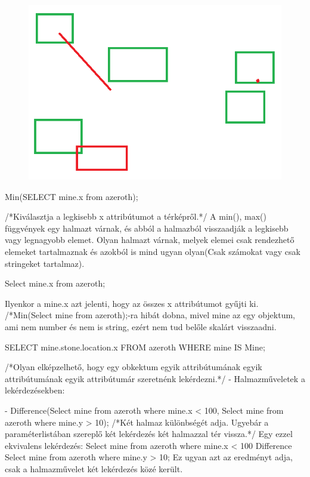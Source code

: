 \begin{sql}
\begin{figure}[htb]
\begin{center}
    \includegraphics[scale=0.5]{images/selection}
    \caption{}
    \label{fig:selection}
\end{center}
\end{figure}

\begin{sql}
Min(SELECT mine.x from azeroth);
\end{sql}
/*Kiválasztja a legkisebb x attribútumot a térképről.*/
A min(), max() függvények egy halmazt várnak, és abból a halmazból visszaadják a legkisebb vagy legnagyobb elemet. Olyan halmazt várnak, melyek elemei csak rendezhető elemeket tartalmaznak és azokból is mind ugyan olyan(Csak számokat vagy csak stringeket tartalmaz).
\begin{sql}
Select mine.x from azeroth;
\end{sql}
Ilyenkor a mine.x  azt jelenti, hogy az összes x attribútumot gyűjti ki.
/*Min(Select mine from azeroth);-ra hibát dobna, mivel mine az egy objektum, ami nem number és nem is string, ezért nem tud belőle skalárt visszaadni.

\begin{sql}
SELECT mine.stone.location.x FROM azeroth WHERE mine IS Mine;
\end{sql}
/*Olyan elképzelhető, hogy egy obkektum egyik attribútumának egyik attribútumának egyik attribútumár szeretnénk lekérdezni.*/
- Halmazműveletek a lekérdezésekben:

- Difference(Select mine from azeroth where mine.x < 100, Select mine from azeroth where mine.y > 10);  /*Két halmaz különbségét adja. Ugyebár a paraméterlistában szereplő két lekérdezés két halmazzal tér vissza.*/
Egy ezzel ekvivalens lekérdezés:
Select mine from azeroth where mine.x < 100 Difference Select mine from azeroth where mine.y > 10;   Ez ugyan azt az eredményt adja, csak a halmazművelet két lekérdezés közé került.


\end{sql}

